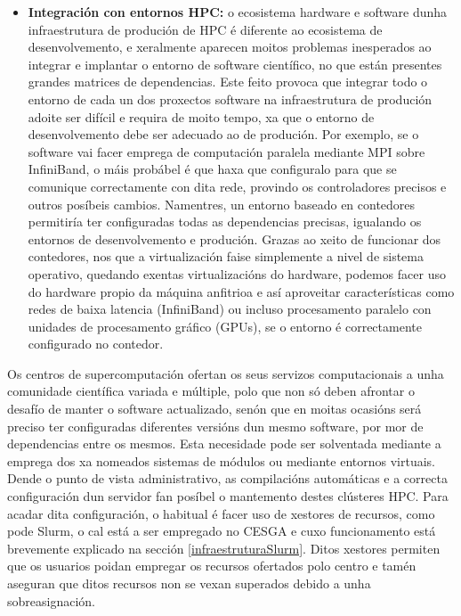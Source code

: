\begin{itemize}
    \item \textbf{Integración con entornos \gls{HPC}:} o ecosistema hardware e software dunha infraestrutura de produción de \gls{HPC} é diferente ao ecosistema de desenvolvemento, e xeralmente aparecen moitos problemas inesperados ao integrar e implantar o entorno de software científico, no que están presentes grandes matrices de dependencias. Este feito provoca que integrar todo o entorno de cada un dos proxectos software na infraestrutura de produción adoite ser difícil e requira de moito tempo, xa que o entorno de desenvolvemento debe ser adecuado ao de produción. Por exemplo, se o software vai facer emprega de computación paralela mediante \gls{MPI} sobre InfiniBand, o máis probábel é que haxa que configuralo para que se comunique correctamente con dita rede, provindo os controladores precisos e outros posíbeis cambios. Namentres, un entorno baseado en contedores permitiría ter configuradas todas as dependencias precisas, igualando os entornos de desenvolvemento e produción. Grazas ao xeito de funcionar dos contedores, nos que a virtualización faise simplemente a nivel de sistema operativo, quedando exentas virtualizacións do hardware, podemos facer uso do hardware propio da máquina anfitrioa e así aproveitar características como redes de baixa latencia (InfiniBand) ou incluso procesamento paralelo con unidades de procesamento gráfico (\gls{GPU}s), se o entorno é correctamente configurado no contedor.
\end{itemize}

Os centros de supercomputación ofertan os seus servizos computacionais a unha comunidade científica variada e múltiple, polo que non só deben afrontar o desafío de manter o software actualizado, senón que en moitas ocasións será preciso ter configuradas diferentes versións dun mesmo software, por mor de dependencias entre os mesmos. Esta necesidade pode ser solventada mediante a emprega dos xa nomeados sistemas de módulos ou mediante entornos virtuais. Dende o punto de vista administrativo, as compilacións automáticas e a correcta configuración dun servidor fan posíbel o mantemento destes clústeres \gls{HPC}. Para acadar dita configuración, o habitual é facer uso de xestores de recursos, como pode Slurm, o cal está a ser empregado no \gls{CESGA} e cuxo funcionamento está brevemente explicado na sección \ref{infraestruturaSlurm}. Ditos xestores permiten que os usuarios poidan empregar os recursos ofertados polo centro e tamén aseguran que ditos recursos non se vexan superados debido a unha sobreasignación. \cite{singularityScientificContainers}

